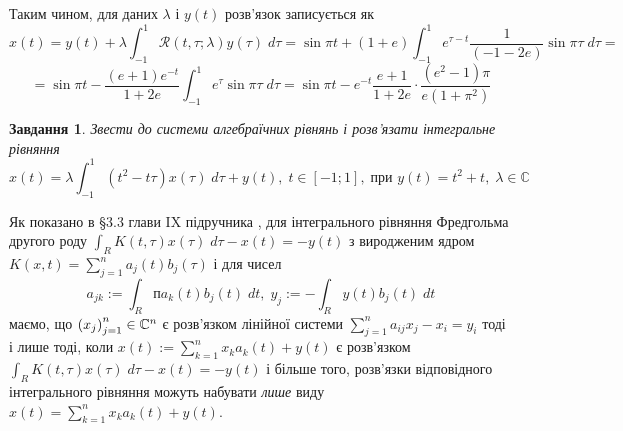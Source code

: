 \documentclass[12pt]{article} %
\newtheorem{prob}{Завдання}
\newcommand{\dt}{\;dt}
\begin{document}
	Таким чином, для даних $\lambda$ і $y(t)$ розв’язок записується як
	\[x(t)=y(t)+\lambda\int_{-1}^1\mathcal{R}(t,\tau;\lambda)y(\tau)\;d\tau=\sin\pi t+(1+e)\int_{-1}^1e^{\tau-t}\frac{1}{(-1-2e)}
	\sin\pi\tau\;d\tau=\]
	\[=\sin\pi t-\frac{(e+1)e^{-t}}{1+2e}\int_{-1}^1e^\tau\sin\pi\tau\;d\tau=\sin\pi t-e^{-t}\frac{e+1}{1+2e}\cdot
	\frac{(e^2-1)\pi}{e(1+\pi^2)}\]
\begin{prob}Звести до системи алгебраїчних рівнянь і розв’язати інтегральне рівняння
	\[x(t)=\lambda\int_{-1}^1(t^2-t\tau)x(\tau)\;d\tau+y(t),\;t\in[-1;1],\;\mbox{при }y(t)=t^2+t,\;\lambda\in\mathbb{C}\]
\end{prob}
Як показано в \S 3.3 глави IX підручника \cite{tb}, для інтегрального рівняння Фредгольма другого роду $\int_RK(t,\tau)x(\tau)\;d\tau
-x(t)=-y(t)$ з виродженим ядром $K(x,t)=\sum_{j=1}^n a_j(t)b_j(\tau)$ і для чисел
\[a_{jk}:=\int_Rпa_k(t)b_j(t)\dt,\;y_j:=-\int_Ry(t)b_j(t)\dt\]
маємо, що $\left(x_j\right)_{j=1}^n\in\mathbb{C}^n$ є розв’язком лінійної системи
$\sum_{j=1}^na_{ij}x_j-x_i=y_i$ тоді і лише тоді, коли $x(t):=\sum_{k=1}^nx_ka_k(t)+y(t)$ є розв’язком $\int_RK(t,\tau)x(\tau)\;d\tau
-x(t)=-y(t)$ і більше того,
розв’язки відповідного інтегрального рівняння можуть набувати {\it лише} виду $x(t)=\sum_{k=1}^nx_ka_k(t)+y(t)$.
\end{document}

